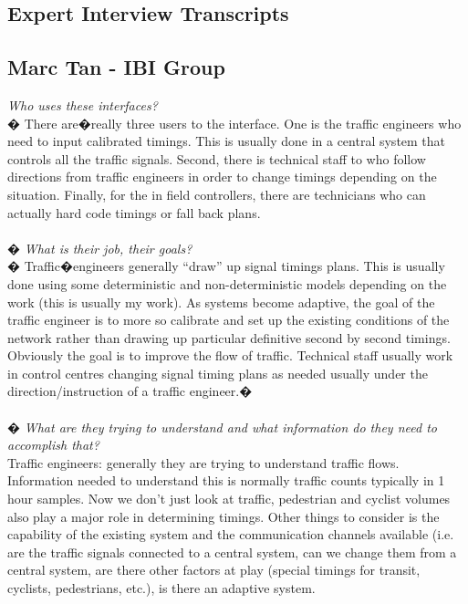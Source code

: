 \documentclass{report}
\begin{document}
\newpage
\begin{appendices}
\chapter{Expert Interview Transcripts}
\section{Marc Tan - IBI Group}
\emph{Who uses these interfaces?} \\
�
There are�really three users to the interface.
One is the traffic engineers who need to input calibrated timings.
This is usually done in a central system that controls all the traffic signals.
Second, there is technical staff to who follow directions from traffic engineers in order to change timings depending on the situation.
Finally, for the in field controllers, there are technicians who can actually hard code timings or fall back plans. \\ \\
�
\emph{What is their job, their goals?} \\
�
Traffic�engineers generally ``draw'' up signal timings plans.
This is usually done using some deterministic and non-deterministic models depending on the work (this is usually my work).
As systems become adaptive, the goal of the traffic engineer is to more so calibrate and set up the existing conditions of the network rather than drawing up particular definitive second by second timings.
Obviously the goal is to improve the flow of traffic.
Technical staff usually work in control centres changing signal timing plans as needed usually under the direction/instruction of a traffic engineer.�\\ \\
�
\emph{What are they trying to understand and what information do they need to accomplish that?} \\ 
Traffic engineers: generally they are trying to understand traffic flows.
Information needed to understand this is normally traffic counts typically in 1 hour samples.
Now we don't just look at traffic, pedestrian and cyclist volumes also play a major role in determining timings.
Other things to consider is the capability of the existing system and the communication channels available (i.e. are the traffic signals connected to a central system, can we change them from a central system, are there other factors at play (special timings for transit, cyclists, pedestrians, etc.), is there an adaptive system.


\end{appendices}
\end{document}
